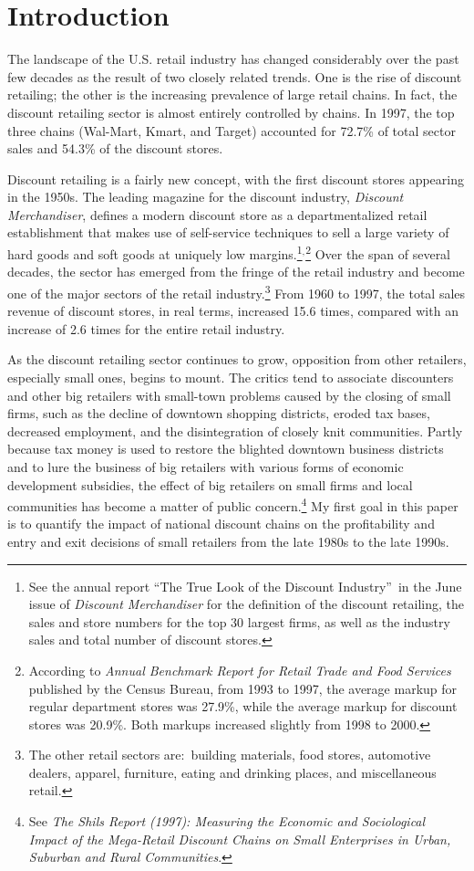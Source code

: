 \documentclass[notitlepage,onecolumn,11pt]{article}
\begin{document}
\section{Introduction}

The landscape of the U.S. retail industry has changed considerably over the
past few decades as the result of two closely related trends. One is the
rise of discount retailing; the other is the increasing prevalence of large
retail chains. In fact, the discount retailing sector is almost entirely
controlled by chains. In 1997, the top three chains (Wal-Mart, Kmart, and
Target) accounted for 72.7\% of total sector sales and 54.3\% of the
discount stores.

Discount retailing is a fairly new concept, with the first discount stores
appearing in the 1950s. The leading magazine for the discount industry, 
\textit{Discount Merchandiser}, defines a modern discount store as a
departmentalized retail establishment that makes use of self-service
techniques to sell a large variety of hard goods and soft goods at uniquely
low margins.\footnote{%
See the annual report \textquotedblleft The True Look of the Discount
Industry\textquotedblright\ in the June issue of \textit{Discount
Merchandiser} for the definition of the discount retailing, the sales and
store numbers for the top 30 largest firms, as well as the industry sales
and total number of discount stores.}$^{,}$\footnote{%
According to \textit{Annual Benchmark Report for Retail Trade and Food
Services} published by the Census Bureau, from 1993 to 1997, the average
markup for regular department stores was 27.9\%, while the average markup
for discount stores was 20.9\%. Both markups increased slightly from 1998 to
2000.} Over the span of several decades, the sector has emerged from the
fringe of the retail industry and become one of the major sectors of the
retail industry.\footnote{%
The other retail sectors are:\ building materials, food stores, automotive
dealers, apparel, furniture, eating and drinking places, and miscellaneous
retail.} From 1960 to 1997, the total sales revenue of discount stores, in
real terms, increased 15.6 times, compared with an increase of 2.6 times for
the entire retail industry.

As the discount retailing sector continues to grow, opposition from other
retailers, especially small ones, begins to mount. The critics tend to
associate discounters and other big retailers with small-town problems
caused by the closing of small firms, such as the decline of downtown
shopping districts, eroded tax bases, decreased employment, and the
disintegration of closely knit communities. Partly because tax money is used
to restore the blighted downtown business districts and to lure the business
of big retailers with various forms of economic development subsidies, the
effect of big retailers on small firms and local communities has become a
matter of public concern.\footnote{%
See \textit{The Shils Report (1997): Measuring the Economic and Sociological
Impact of the Mega-Retail Discount Chains on Small Enterprises in Urban,
Suburban and Rural Communities}.} My first goal in this paper is to quantify
the impact of national discount chains on the profitability and entry and
exit decisions of small retailers from the late 1980s to the late 1990s.
\end{document}
